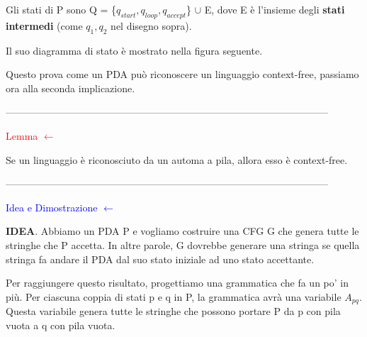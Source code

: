 \documentclass{article}
\begin{document}
Gli stati di P sono Q = \{$q_{start}, q_{loop}, q_{accept}$\} $\cup$ E, dove E è l'insieme degli \textbf{stati intermedi} (come $q_1, q_2$ nel disegno sopra).

Il suo diagramma di stato è mostrato nella figura seguente.

\begin{center}
\end{center}

Questo prova come un PDA può riconoscere un linguaggio context-free, passiamo ora alla seconda implicazione.

--------------------------------------------------------------------------------------------------

\begin{center}
    \textcolor{red}{Lemma $\leftarrow$}
\end{center}

Se un linguaggio è riconosciuto da un automa a pila, allora esso è context-free.

--------------------------------------------------------------------------------------------------

\textcolor{blue}{Idea e Dimostrazione $\leftarrow$}

\textbf{IDEA}. Abbiamo un PDA P e vogliamo costruire una CFG G che genera tutte le stringhe che P accetta. In altre parole, G dovrebbe generare una stringa se quella stringa fa andare il PDA dal suo stato iniziale ad uno stato accettante.

Per raggiungere questo risultato, progettiamo una grammatica che fa un po' in più. Per ciascuna coppia di stati p e q in P, la grammatica avrà una variabile $A_{pq}$. Questa variabile genera tutte le stringhe che possono portare P da p con pila vuota a q con pila vuota.
\end{document}
